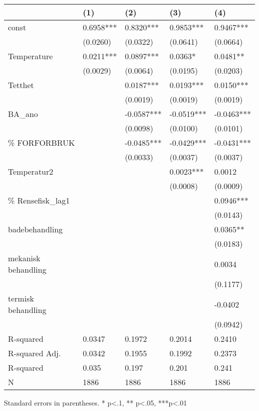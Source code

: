 \begin{table}
\caption{}
\label{}
\begin{center}
\begin{tabular}{lllll}
\hline
                    & (1)       & (2)        & (3)        & (4)         \\
\hline
const               & 0.6958*** & 0.8320***  & 0.9853***  & 0.9467***   \\
                    & (0.0260)  & (0.0322)   & (0.0641)   & (0.0664)    \\
Temperature         & 0.0211*** & 0.0897***  & 0.0363*    & 0.0481**    \\
                    & (0.0029)  & (0.0064)   & (0.0195)   & (0.0203)    \\
Tetthet             &           & 0.0187***  & 0.0193***  & 0.0150***   \\
                    &           & (0.0019)   & (0.0019)   & (0.0019)    \\
BA\_ano             &           & -0.0587*** & -0.0519*** & -0.0463***  \\
                    &           & (0.0098)   & (0.0100)   & (0.0101)    \\
\% FORFORBRUK       &           & -0.0485*** & -0.0429*** & -0.0431***  \\
                    &           & (0.0033)   & (0.0037)   & (0.0037)    \\
Temperatur2         &           &            & 0.0023***  & 0.0012      \\
                    &           &            & (0.0008)   & (0.0009)    \\
\% Rensefisk\_lag1  &           &            &            & 0.0946***   \\
                    &           &            &            & (0.0143)    \\
badebehandling      &           &            &            & 0.0365**    \\
                    &           &            &            & (0.0183)    \\
mekanisk behandling &           &            &            & 0.0034      \\
                    &           &            &            & (0.1177)    \\
termisk behandling  &           &            &            & -0.0402     \\
                    &           &            &            & (0.0942)    \\
R-squared           & 0.0347    & 0.1972     & 0.2014     & 0.2410      \\
R-squared Adj.      & 0.0342    & 0.1955     & 0.1992     & 0.2373      \\
R-squared           & 0.035     & 0.197      & 0.201      & 0.241       \\
N                   & 1886      & 1886       & 1886       & 1886        \\
\hline
\end{tabular}
\end{center}
\end{table}
\bigskip
Standard errors in parentheses. \newline 
* p<.1, ** p<.05, ***p<.01